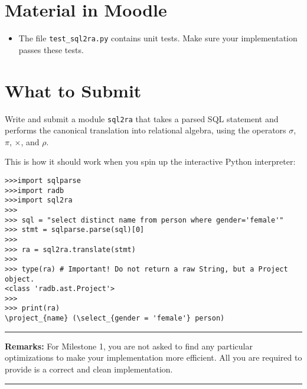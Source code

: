 \documentclass[12pt]{exam}
\begin{document}
\section{Material in Moodle}
\noindent
\begin{itemize}
\item
The file \verb!test_sql2ra.py! contains unit tests. Make sure your implementation passes these tests.
\end{itemize}

\section{What to Submit}

\noindent
Write and submit a module \verb!sql2ra! that takes a parsed SQL statement and performs the canonical translation into relational algebra, using the operators $\sigma$, $\pi$, $\times$, and $\rho$.

\noindent
This is how it should work when you spin up the interactive Python interpreter:

\begin{Verbatim}[frame=single]
>>>import sqlparse
>>>import radb
>>>import sql2ra
>>>
>>> sql = "select distinct name from person where gender='female'"
>>> stmt = sqlparse.parse(sql)[0]
>>>
>>> ra = sql2ra.translate(stmt)
>>>
>>> type(ra) # Important! Do not return a raw String, but a Project object.
<class 'radb.ast.Project'>
>>>
>>> print(ra)
\project_{name} (\select_{gender = 'female'} person)
\end{Verbatim}


\bigskip
\noindent
\rule{\linewidth}{0.5mm}


{\bf Remarks:}
For Milestone 1, you are not asked to find any particular optimizations to make your implementation more efficient. All you are required to provide is a correct and clean implementation.

\noindent
\rule{\linewidth}{0.5mm}
\end{document}
